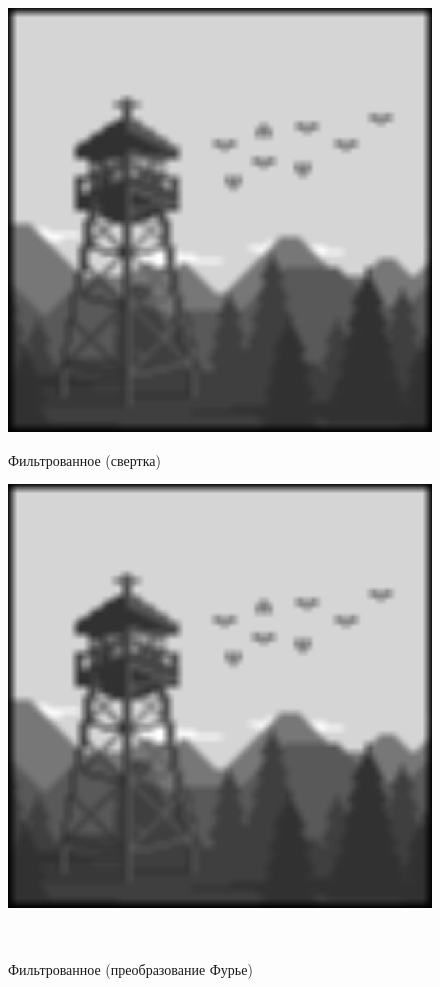 \documentclass[a4paper]{article}
\begin{document}
\begin{figure}[H]
    \begin{minipage}{0.49\textwidth}
        \centering \includegraphics[width=\textwidth]{2/11_img_block_by_conv2.png}
        \caption{Фильтрованное (свертка)}
    \end{minipage}\hfill
    \begin{minipage}{0.49\textwidth}
        \centering \includegraphics[width=\textwidth]{2/11_img_block_by_fourier.png}
        \caption{Фильтрованное (преобразование Фурье)}
    \end{minipage}\\[1em]
\end{figure}\noindent\
\end{document}
